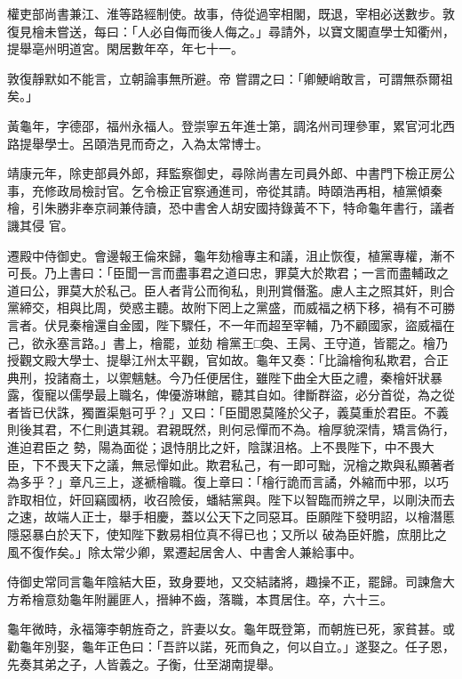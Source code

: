 \begin{pinyinscope}
 權吏部尚書兼江、淮等路經制使。故事，侍從過宰相閣，既退，宰相必送數步。敦復見檜未嘗送，每曰：「人必自侮而後人侮之。」尋請外，以寶文閣直學士知衢州，提舉亳州明道宮。閑居數年卒，年七十一。



 敦復靜默如不能言，立朝論事無所避。帝
 嘗謂之曰：「卿鯁峭敢言，可謂無忝爾祖矣。」



 黃龜年，字德邵，福州永福人。登崇寧五年進士第，調洺州司理參軍，累官河北西路提舉學士。呂頤浩見而奇之，入為太常博士。



 靖康元年，除吏部員外郎，拜監察御史，尋除尚書左司員外郎、中書門下檢正房公事，充修政局檢討官。乞令檢正官察通進司，帝從其請。時頤浩再相，植黨傾秦檜，引朱勝非奉京祠兼侍讀，恐中書舍人胡安國持錄黃不下，特命龜年書行，議者譏其侵
 官。



 遷殿中侍御史。會邊報王倫來歸，龜年劾檜專主和議，沮止恢復，植黨專權，漸不可長。乃上書曰：「臣聞一言而盡事君之道曰忠，罪莫大於欺君；一言而盡輔政之道曰公，罪莫大於私己。臣人者背公而徇私，則刑賞僭濫。慮人主之照其奸，則合黨締交，相與比周，熒惑主聽。故附下罔上之黨盛，而威福之柄下移，禍有不可勝言者。伏見秦檜還自金國，陛下驟任，不一年而超至宰輔，乃不顧國家，盜威福在己，欲永塞言路。」書上，檜罷，並劾
 檜黨王□奐、王昺、王守道，皆罷之。檜乃授觀文殿大學士、提舉江州太平觀，官如故。龜年又奏：「比論檜徇私欺君，合正典刑，投諸裔土，以禦魑魅。今乃任便居住，雖陛下曲全大臣之禮，秦檜奸狀暴露，復寵以儒學最上職名，俾優游琳館，聽其自如。律斷群盜，必分首從，為之從者皆已伏誅，獨置渠魁可乎？」又曰：「臣聞恩莫隆於父子，義莫重於君臣。不義則後其君，不仁則遺其親。君親既然，則何忌憚而不為。檜厚貌深情，矯言偽行，進迫君臣之
 勢，陽為面從；退恃朋比之奸，陰謀沮格。上不畏陛下，中不畏大臣，下不畏天下之議，無忌憚如此。欺君私己，有一即可黜，況檜之欺與私顯著者為多乎？」章凡三上，遂褫檜職。復上章曰：「檜行詭而言譎，外縮而中邪，以巧詐取相位，奸回竊國柄，收召險佞，蟠結黨與。陛下以智臨而辨之早，以剛決而去之速，故端人正士，舉手相慶，蓋以公天下之同惡耳。臣願陛下發明詔，以檜潛慝隱惡暴白於天下，使知陛下數易相位真不得已也；又所以
 破為臣奸膽，庶朋比之風不復作矣。」除太常少卿，累遷起居舍人、中書舍人兼給事中。



 侍御史常同言龜年陰結大臣，致身要地，又交結諸將，趣操不正，罷歸。司諫詹大方希檜意劾龜年附麗匪人，搢紳不齒，落職，本貫居住。卒，六十三。



 龜年微時，永福簿李朝旌奇之，許妻以女。龜年既登第，而朝旌已死，家貧甚。或勸龜年別娶，龜年正色曰：「吾許以諾，死而負之，何以自立。」遂娶之。任子恩，先奏其弟之子，人皆義之。子衡，仕至湖南提舉。




\end{pinyinscope}
